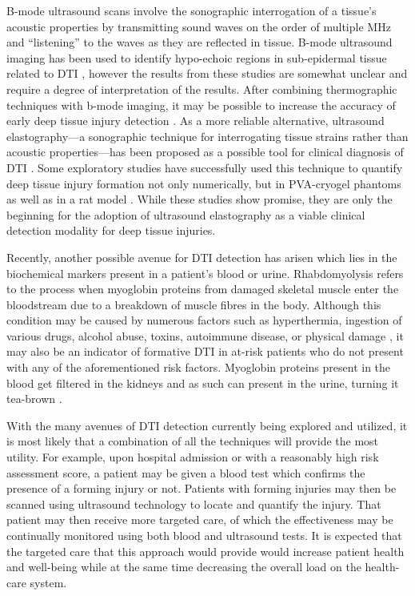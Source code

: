 			B-mode ultrasound scans involve the sonographic interrogation of a tissue's acoustic properties by transmitting sound waves on the order of multiple \si{MHz} and ``listening'' to the waves as they are reflected in tissue. B-mode ultrasound imaging has been used to identify hypo-echoic regions in sub-epidermal tissue related to DTI \cite{andersen08,aoi08,kanno09}, however the results from these studies are somewhat unclear and require a degree of interpretation of the results. After combining thermographic techniques with b-mode imaging, it may be possible to increase the accuracy of early deep tissue injury detection \cite{higashino12}. As a more reliable alternative, ultrasound elastography---a sonographic technique for interrogating tissue strains rather than acoustic properties---has been proposed as a possible tool for clinical diagnosis of DTI \cite{gehin06,gefen09,gefen13}. Some exploratory studies have successfully used this technique to quantify deep tissue injury formation not only numerically, but in {PVA}-cryogel phantoms as well as in a rat model \cite{deprez07,deprez11}. While these studies show promise, they are only the beginning for the adoption of ultrasound elastography as a viable clinical detection modality for deep tissue injuries.

			Recently, another possible avenue for DTI detection has arisen which lies in the biochemical markers present in a patient's blood or urine. Rhabdomyolysis refers to the process when myoglobin proteins from damaged skeletal muscle enter the bloodstream due to a breakdown of muscle fibres in the body. Although this condition may be caused by numerous factors such as hyperthermia, ingestion of various drugs, alcohol abuse, toxins, autoimmune disease, or physical damage \cite{beetham00,sauret02}, it may also be an indicator of formative DTI in at-risk patients who do not present with any of the aforementioned risk factors. Myoglobin proteins present in the blood get filtered in the kidneys and as such can present in the urine, turning it tea-brown \cite{bagley07}.

			With the many avenues of DTI detection currently being explored and utilized, it is most likely that a combination of all the techniques will provide the most utility. For example, upon hospital admission or with a reasonably high risk assessment score, a patient may be given a blood test which confirms the presence of a forming injury or not. Patients with forming injuries may then be scanned using ultrasound technology to locate and quantify the injury. That patient may then receive more targeted care, of which the effectiveness may be continually monitored using both blood and ultrasound tests. It is expected that the targeted care that this approach would provide would increase patient health and well-being while at the same time decreasing the overall load on the health-care system.


